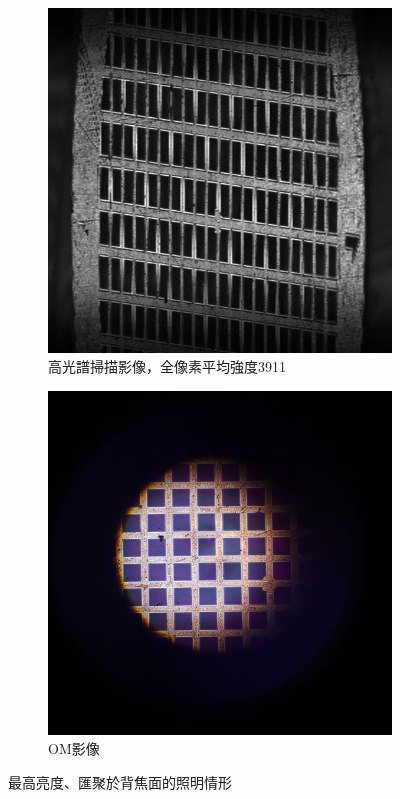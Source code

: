 \documentclass[12pt]{article}
\begin{document}
\begin{figure}
    \centering
    \begin{subfigure}[t]{0.45\textwidth}
        \centering
        \includegraphics[width=\linewidth]{on_brightest.jpg}
        \caption{高光譜掃描影像，全像素平均強度3911}
        \label{figure: brightest_on}
    \end{subfigure}
    \begin{subfigure}[t]{0.45\textwidth}
        \centering
        \includegraphics[width=\linewidth]{om_on_brightest.JPG}
        \caption{OM影像}
        \label{figure: brightest_on_om}
    \end{subfigure}
    \caption{最高亮度、匯聚於背焦面的照明情形}
\end{figure}
\end{document}
